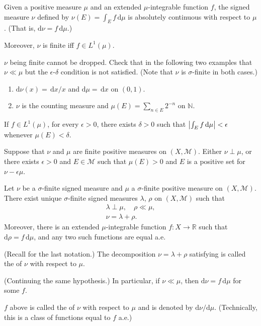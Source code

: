 \documentclass[12pt]{article}	%
\begin{document}
\begin{rem}
	Given a positive measure $\mu$ and an extended $\mu$-integrable function $f$, the signed measure $\nu$ defined by $\nu(E) = \int_{E} f \,{\mathrm{d}}\mu$ is absolutely continuous with respect to $\mu$. (That is, ${\mathrm d}\nu = f \,{\mathrm d}\mu$.)

	Moreover, $\nu$ is finite iff $f \in L^{1}(\mu)$.
\end{rem}
\begin{exe}
	$\nu$ being finite cannot be dropped. Check that in the following two examples that $\nu \ll \mu$ but the $\epsilon$-$\delta$ condition is not satisfied. (Note that $\nu$ is $\sigma$-finite in both cases.)
	\begin{enumerate}
		\item ${\mathrm d} \nu(x) = \,{\mathrm d}x/x$ and ${\mathrm d}\mu = \,{\mathrm d} x$ on $(0, 1)$.
		\item $\nu$ is the counting measure and $\mu(E) = \sum_{n \in E} 2^{-n}$ on $\mathbb{N}$.
	\end{enumerate}
\end{exe}

\begin{cor}
	If $f \in L^{1}(\mu)$, for every $\epsilon > 0$, there exists $\delta > 0$ such that ${\left\lvert \int_{E} f \,{\mathrm{d}}\mu \right\lvert} < \epsilon$ whenever $\mu(E) < \delta$.
\end{cor}

\begin{prop}
	Suppose that $\nu$ and $\mu$ are finite positive measures on $(X, \mathcal{M})$. Either $\nu \perp \mu$, or there exists $\epsilon > 0$ and $E \in \mathcal{M}$ such that $\mu(E) > 0$ and $E$ is a positive set for $\nu - \epsilon \mu$.
\end{prop}

\begin{thm}
	Let $\nu$ be a $\sigma$-finite signed measure and $\mu$ a $\sigma$-finite positive measure on $(X, \mathcal{M})$. There exist unique $\sigma$-finite signed measures $\lambda$, $\rho$ on $(X, \mathcal{M})$ such that
	\begin{align}
		\lambda \perp \mu, \quad \rho \ll \mu, \label{eq:003} \\
		\nu = \lambda + \rho. \label{eq:004}
	\end{align}
	Moreover, there is an extended $\mu$-integrable function $f : X \to \mathbb{R}$ such that ${\mathrm d}\rho = f \,{\mathrm d}\mu$, and any two such functions are equal a.e.
\end{thm}
(Recall  for the last notation.) The decomposition $\nu = \lambda + \rho$ satisfying  is called the  of $\nu$ with respect to $\mu$.
\begin{cor}
	(Continuing the same hypothesis.) In particular, if $\nu \ll \mu$, then ${\mathrm d} \nu = f \,{\mathrm d} \mu$ for some $f$.
\end{cor}
$f$ above is called the  of $\nu$ with respect to $\mu$ and is denoted by ${\mathrm d} \nu/{\mathrm d} \mu$. (Technically, this is a class of functions equal to $f$ a.e.)
\end{document}
